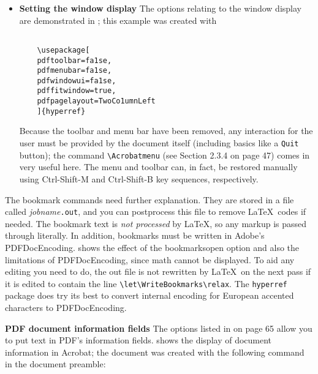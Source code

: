 \begin{itemize}
  \item \textbf{Setting the window display} The options relating to the window display are 
    demonstrated in ; this example was created with 

    \begin{verbatim}

    \usepackage[ 
    pdftoolbar=fa1se, 
    pdfmenubar=fa1se, 
    pdfwindowui=fa1se, 
    pdffitwindow=true, 
    pdfpagelayout=TwoCo1umnLeft 
    ]{hyperref} 

    \end{verbatim}


    Because the toolbar and menu bar have been removed, any interaction
    for the user must be provided by the document itself (including
    basics like a \verb|Quit| button); the command \verb|\Acrobatmenu|
    (see Section 2.3.4 on page 47) comes in very useful here.  The menu
    and toolbar can, in fact, be restored manually using Ctrl-Shift-M
    and Ctrl-Shift-B key sequences, respectively. 

\end{itemize}



The bookmark commands need further explanation. They are stored in a
file called \emph{jobname}\verb|.out|, and you can postprocess this file to remove 
\LaTeX\ codes if needed.  The bookmark text is \emph{not processed} by \LaTeX,
so any markup is passed through literally. In addition, bookmarks must
be written in Adobe's PDFDocEncoding.  shows the effect of
the bookmarksopen option and also the limitations of PDFDocEncoding,
since math cannot be displayed. To aid any editing you need to do, the
out file is not rewritten by \LaTeX\  on the next pass if it is edited
to contain the line \verb|\let\WriteBookmarks\relax|. The \verb|hyperref| package does try its best to 
convert internal encoding for European accented characters to PDFDocEncoding. 

\noindent\textbf{PDF document information fields} The options listed in  on page 65 
allow you to put text in PDF's information fields.  shows the display of 
document information in Acrobat; the document was created with the following 
command in the document preamble: 

